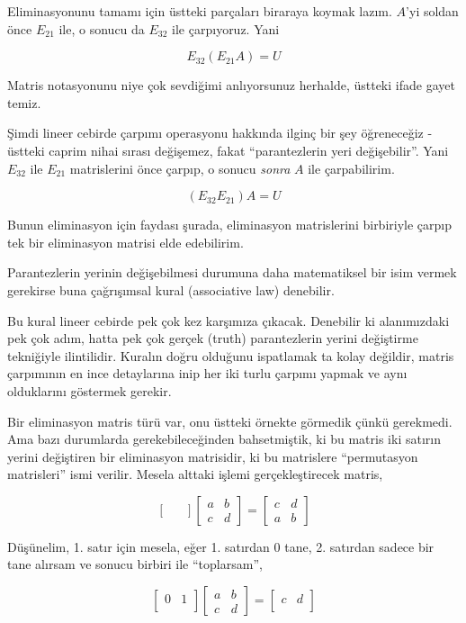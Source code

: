 \documentclass[12pt,fleqn]{article}\usepackage{../../common}
\begin{document}
Eliminasyonunu tamamı için üstteki parçaları biraraya koymak
lazım. $A$'yi soldan önce $E_{21}$ ile, o sonucu da $E_{32}$ ile
çarpıyoruz. Yani

$$ E_{32} (E_{21}A) = U $$

Matris notasyonunu niye çok sevdiğimi anlıyorsunuz herhalde, üstteki ifade
gayet temiz. 

Şimdi lineer cebirde çarpımı operasyonu hakkında ilginç bir şey öğreneceğiz
- üstteki caprim nihai sırası değişemez, fakat ``parantezlerin yeri
değişebilir''. Yani $E_{32}$ ile $E_{21}$ matrislerini önce çarpıp, o
sonucu {\em sonra} $A$ ile çarpabilirim. 

$$ (E_{32} E_{21}) A = U $$

Bunun eliminasyon için faydası şurada, eliminasyon matrislerini birbiriyle
çarpıp tek bir eliminasyon matrisi elde edebilirim. 

Parantezlerin yerinin değişebilmesi durumuna daha matematiksel bir isim
vermek gerekirse buna çağrışımsal kural (associative law) denebilir. 

Bu kural lineer cebirde pek çok kez karşımıza çıkacak. Denebilir ki
alanımızdaki pek çok adım, hatta pek çok gerçek (truth) parantezlerin
yerini değiştirme tekniğiyle ilintilidir. Kuralın doğru olduğunu ispatlamak
ta kolay değildir, matris çarpımının en ince detaylarına inip her iki turlu
çarpımı yapmak ve aynı olduklarını göstermek gerekir. 

Bir eliminasyon matris türü var, onu üstteki örnekte görmedik çünkü
gerekmedi. Ama bazı durumlarda gerekebileceğinden bahsetmiştik, ki bu
matris iki satırın yerini değiştiren bir eliminasyon matrisidir, ki bu
matrislere ``permutasyon matrisleri'' ismi verilir. Mesela alttaki işlemi
gerçekleştirecek matris,

$$ 
\left[\begin{array}{rr}
 &  \\
 & 
\end{array}\right]
\left[\begin{array}{rr}
a & b \\
c & d
\end{array}\right]
=
\left[\begin{array}{rr}
c & d \\
a & b 
\end{array}\right]
 $$

Düşünelim, 1. satır için mesela, eğer 1. satırdan 0 tane, 2. satırdan
sadece bir tane alırsam ve sonucu birbiri ile ``toplarsam'', 

$$ 
\left[\begin{array}{rr}
0 & 1 \\
 & 
\end{array}\right]
\left[\begin{array}{rr}
a & b \\
c & d
\end{array}\right]
=
\left[\begin{array}{rr}
c & d \\
 & 
\end{array}\right]
 $$
\end{document}
